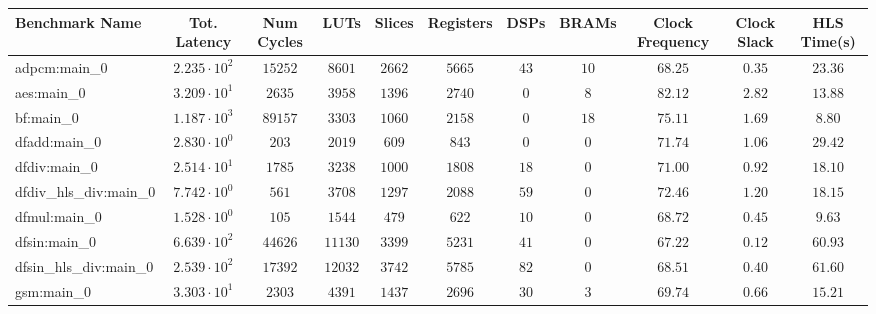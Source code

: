 \begin{tabular}{|l|c|c|c|c|c|c|c|c|c|c|}
\hline
Benchmark Name          & Tot. Latency           & Num Cycles & LUTs      & Slices    & Registers & DSPs    & BRAMs   & Clock Frequency & Clock Slack & HLS Time(s) \\
\hline
adpcm:main\_0           & $ 2.235 \cdot 10^{2} $ & $ 15252  $ & $ 8601  $ & $ 2662  $ & $ 5665  $ & $ 43  $ & $ 10  $ & $ 68.25       $ & $ 0.35    $ & $ 23.36   $ \\
aes:main\_0             & $ 3.209 \cdot 10^{1} $ & $ 2635   $ & $ 3958  $ & $ 1396  $ & $ 2740  $ & $ 0   $ & $ 8   $ & $ 82.12       $ & $ 2.82    $ & $ 13.88   $ \\
bf:main\_0              & $ 1.187 \cdot 10^{3} $ & $ 89157  $ & $ 3303  $ & $ 1060  $ & $ 2158  $ & $ 0   $ & $ 18  $ & $ 75.11       $ & $ 1.69    $ & $ 8.80    $ \\
dfadd:main\_0           & $ 2.830 \cdot 10^{0} $ & $ 203    $ & $ 2019  $ & $ 609   $ & $ 843   $ & $ 0   $ & $ 0   $ & $ 71.74       $ & $ 1.06    $ & $ 29.42   $ \\
dfdiv:main\_0           & $ 2.514 \cdot 10^{1} $ & $ 1785   $ & $ 3238  $ & $ 1000  $ & $ 1808  $ & $ 18  $ & $ 0   $ & $ 71.00       $ & $ 0.92    $ & $ 18.10   $ \\
dfdiv\_hls\_div:main\_0 & $ 7.742 \cdot 10^{0} $ & $ 561    $ & $ 3708  $ & $ 1297  $ & $ 2088  $ & $ 59  $ & $ 0   $ & $ 72.46       $ & $ 1.20    $ & $ 18.15   $ \\
dfmul:main\_0           & $ 1.528 \cdot 10^{0} $ & $ 105    $ & $ 1544  $ & $ 479   $ & $ 622   $ & $ 10  $ & $ 0   $ & $ 68.72       $ & $ 0.45    $ & $ 9.63    $ \\
dfsin:main\_0           & $ 6.639 \cdot 10^{2} $ & $ 44626  $ & $ 11130 $ & $ 3399  $ & $ 5231  $ & $ 41  $ & $ 0   $ & $ 67.22       $ & $ 0.12    $ & $ 60.93   $ \\
dfsin\_hls\_div:main\_0 & $ 2.539 \cdot 10^{2} $ & $ 17392  $ & $ 12032 $ & $ 3742  $ & $ 5785  $ & $ 82  $ & $ 0   $ & $ 68.51       $ & $ 0.40    $ & $ 61.60   $ \\
gsm:main\_0             & $ 3.303 \cdot 10^{1} $ & $ 2303   $ & $ 4391  $ & $ 1437  $ & $ 2696  $ & $ 30  $ & $ 3   $ & $ 69.74       $ & $ 0.66    $ & $ 15.21   $ \\

\end{tabular}
